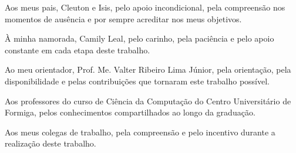 \begin{agradecimentos}[Agradecimentos]

Aos meus pais, Cleuton e Isis, pelo apoio incondicional, pela compreensão nos momentos de ausência e por
sempre acreditar nos meus objetivos.

À minha namorada, Camily Leal, pelo carinho, pela paciência e pelo apoio constante em cada etapa deste
trabalho.

Ao meu orientador, Prof. Me. Valter Ribeiro Lima Júnior, pela orientação, pela disponibilidade
e pelas contribuições que tornaram este trabalho possível.

Aos professores do curso de Ciência da Computação do Centro Universitário de Formiga, pelos
conhecimentos compartilhados ao longo da graduação.

Aos meus colegas de trabalho, pela compreensão e pelo incentivo durante a realização deste
trabalho.

\end{agradecimentos}
